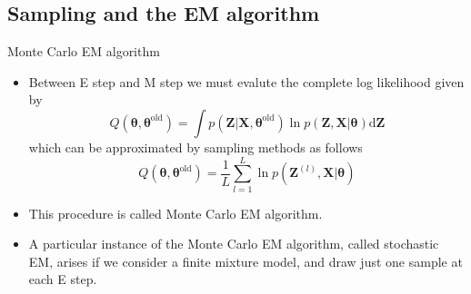 \documentclass{bredelebeamer}
\begin{document}
\subsection{Sampling and the EM algorithm}
\begin{frame}{Monte Carlo EM algorithm}
  \begin{itemize}
    \item Between E step and M step we must evalute the complete log likelihood
    given by
    \begin{equation}
      Q(\boldsymbol{\theta},\boldsymbol{\theta}^{\textrm{old}})
      = \int p(\mathbf{Z}|\mathbf{X},\boldsymbol{\theta}^{\textrm{old}})
      \ln p(\mathbf{Z},\mathbf{X}|\boldsymbol{\theta})
      \mathrm{d}\mathbf{Z}
    \end{equation}
    which can be approximated by sampling methods as follows
    \begin{equation}
      Q(\boldsymbol{\theta},\boldsymbol{\theta}^{\textrm{old}})
      = \frac{1}{L} \sum_{l=1}^{L} \ln p(\mathbf{Z}^{(l)}, \mathbf{X} | \boldsymbol{\theta})
    \end{equation}
    \item This procedure is called Monte Carlo EM algorithm.
    \item A particular instance of the Monte Carlo EM algorithm, called
    stochastic EM, arises if we consider a finite mixture model, and draw
    just one sample at each E step.
  \end{itemize}
\end{frame}
\end{document}
